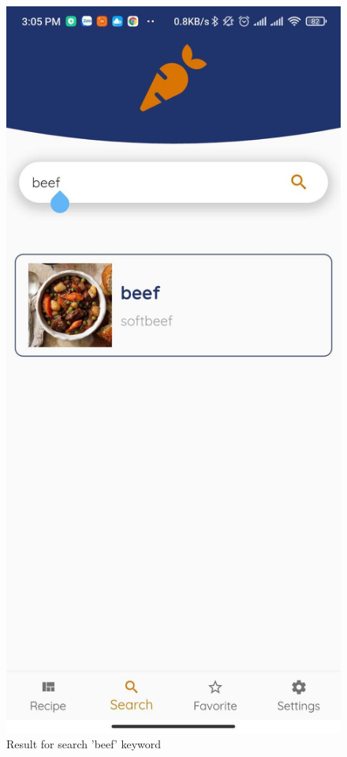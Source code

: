 \documentclass{article}
\begin{document}
\begin{figure}[h!]
    \includegraphics[scale=0.15]{Images/search1.jpg}
    
    \caption{Result for search 'beef' keyword}
    
    \label{fig:cookingbook}
    \end{figure}
    \newpage 
    
\end{document}

